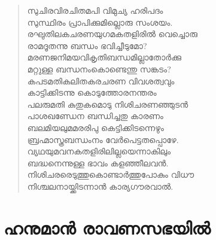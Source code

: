\begin{verse}
സുചിരവിരചിതമപി വിമുച്യ ഹരിപദം\\
സുസ്ഥിരം പ്രാപിക്കുമില്ലൊരു സംശയം.\\
രഘുതിലകചരണയുഗമകതളിരില്‍ വെച്ചൊരു\\
രാമദൂതന്നു ബന്ധം ഭവിച്ചീടുമോ?\\
മരണജനിമയവികൃതിബന്ധമില്ലാതോര്‍ക്കു\\
മറ്റുള്ള ബന്ധനംകൊണ്ടെന്തു സങ്കടം?\\
കപടമതികലിതകരചരണ വിവശത്വവും\\
കാട്ടിക്കിടന്നു കൊടുത്തോരനന്തരം\\
പലരുമതി കുതുകമൊടു നിശിചരണഞ്ഞുടന്‍\\
പാശഖണ്ഡേന ബന്ധിച്ചതു കാരണം\\
ബലമിയലുമമരരിപു കെട്ടിക്കിടന്നെഴും\\
ബ്രഹ്മാസ്ത്രബന്ധംനം വേര്‍പെട്ടതപ്പൊഴേ.\\
വ്യഥയുമവനകതളിരിലില്ലയെന്നാകിലും\\
ബദ്ധനെന്നുള്ള ഭാവം കളഞ്ഞീലവന്‍.\\
നിശിചരരെടുത്തുകൊണ്ടാര്‍ത്തുപോകും വിധൗ\\
നിശ്ചലനായ്ക്കിടന്നാന്‍ കാര്യഗൗരവാല്‍.
\end{verse}


\section{ഹനുമാന്‍ രാവണസഭയില്‍}

